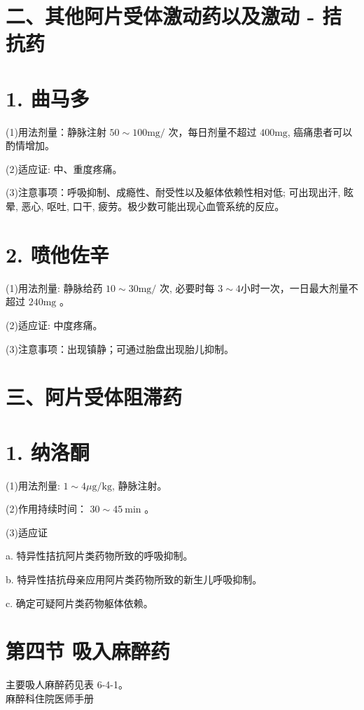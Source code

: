 \documentclass[10pt]{article}
\begin{document}
\section*{二、其他阿片受体激动药以及激动 - 拮抗药}
\section*{1. 曲马多}
(1)用法剂量：静脉注射 $50 \sim 100 \mathrm{mg} /$ 次，每日剂量不超过 $400 \mathrm{mg}$, 癌痛患者可以酌情增加。

(2)适应证: 中、重度疼痛。

(3)注意事项：呼吸抑制、成瘾性、耐受性以及躯体依赖性相对低; 可出现出汗, 眩晕, 恶心, 呕吐, 口干, 疲劳。极少数可能出现心血管系统的反应。

\section*{2. 喷他佐辛}
(1)用法剂量: 静脉给药 $10 \sim 30 \mathrm{mg} /$ 次, 必要时每 $3 \sim 4$小时一次，一日最大剂量不超过 $240 \mathrm{mg}$ 。

(2)适应证: 中度疼痛。

(3)注意事项：出现镇静；可通过胎盘出现胎儿抑制。

\section*{三、阿片受体阻滞药}
\section*{1. 纳洛酮}
(1)用法剂量: $1 \sim 4 \mu \mathrm{g} / \mathrm{kg}$, 静脉注射。

(2)作用持续时间： $30 \sim 45 \mathrm{~min}$ 。

(3)适应证

a. 特异性拮抗阿片类药物所致的呼吸抑制。

b. 特异性拮抗母亲应用阿片类药物所致的新生儿呼吸抑制。

c. 确定可疑阿片类药物躯体依赖。

\section*{第四节 吸入麻醉药}
主要吸人麻醉药见表 6-4-1。\\
麻醉科住院医师手册
\end{document}
